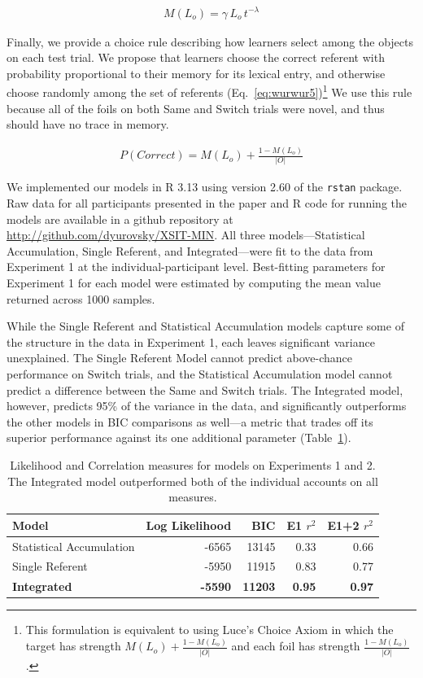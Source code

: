 \documentclass[man,floatsintext]{apa6}
\begin{document}
\begin{align}
M(L_{o}) = \gamma \, L_{o} \, t^{-\lambda} \label{eq:wurwur4}
\end{align}

Finally, we provide a choice rule describing how learners select among the objects on each test trial. We propose that learners choose the correct referent with probability proportional to their memory for its lexical entry, and otherwise choose randomly among the set of referents (Eq.~\ref{eq:wurwur5})\footnote{This formulation is equivalent to using Luce's Choice Axiom \cite{Luce1959} in which the target has strength  $M(L_{o}) + \frac{1-M(L_{o})}{|O|}$ and each foil has strength $\frac{1-M(L_{o})}{|O|}$.} We use this rule because all of the foils on both Same and Switch trials were novel, and thus should have no trace in memory.

\begin{align}
P(Correct) = M(L_{o}) + \frac{1-M(L_{o})}{|O|} \label{eq:wurwur5}
\end{align}

We implemented our models in R 3.13 using version 2.60 of the \texttt{rstan} package. Raw data for all participants presented in the paper and R code for running the models are available in a github repository at \url{http://github.com/dyurovsky/XSIT-MIN}. All three models---Statistical Accumulation, Single Referent, and Integrated---were fit to the data from Experiment 1 at the individual-participant level. Best-fitting parameters for Experiment 1 for each model were estimated by computing the mean value returned across 1000 samples.

While the Single Referent and Statistical Accumulation models capture some of the structure in the data in Experiment 1, each leaves significant variance unexplained. The Single Referent Model cannot predict above-chance performance on Switch trials, and the Statistical Accumulation model cannot predict a difference between the Same and Switch trials. The Integrated model, however, predicts 95\% of the variance in the data, and significantly outperforms the other models in BIC comparisons as well---a metric that trades off its superior performance against its one additional parameter (Table~\ref{tab:model}).

\begin{table}[tb]
\begin{center}
\begin{tabular}{lrrrr}
  Model & Log Likelihood & BIC & E1 $r^{2}$ & E1+2 $r^{2}$ \\ 
  \hline
  Statistical Accumulation & -6565 & 13145 & 0.33 & 0.66 \\ 
  Single Referent & -5950 & 11915 & 0.83 & 0.77 \\ 
  \textbf{Integrated} & \textbf{-5590} & \textbf{11203} & \textbf{0.95} & \textbf{0.97} \\ 
  \hline
\end{tabular}
\end{center}
\caption{\label{tab:model}Likelihood and Correlation measures for models on Experiments 1 and 2. The Integrated model outperformed both of the individual accounts on all measures.}
\end{table}
\end{document}
